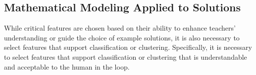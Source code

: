\documentclass[12pt]{article}
\begin{document}


\subsection{Mathematical Modeling Applied to Solutions}

While critical features are chosen based on their ability to enhance teachers' understanding or guide the choice of example solutions, it is also necessary to select features that support classification or clustering. Specifically, it is necessary to select features that support classification or clustering that is understandable and acceptable to the human in the loop.

%
%
%
\end{document}

